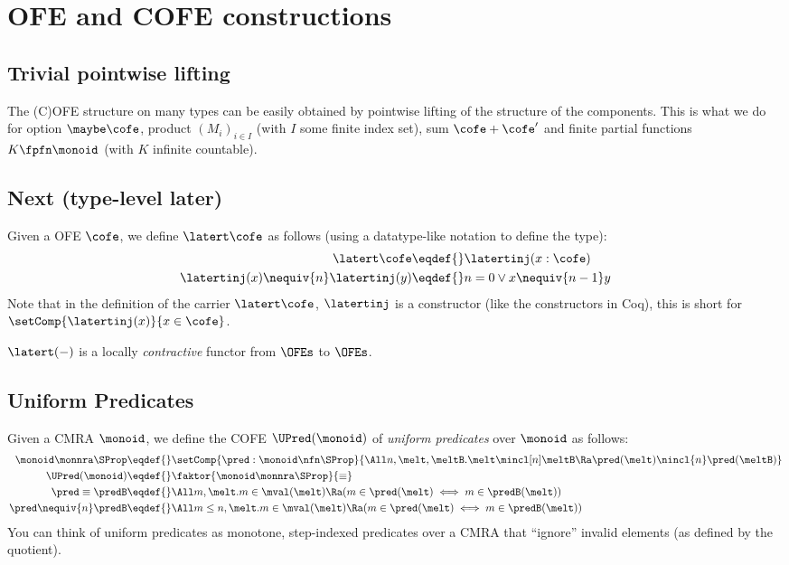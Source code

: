 \section{OFE and COFE constructions}

\subsection{Trivial pointwise lifting}

The (C)OFE structure on many types can be easily obtained by pointwise lifting of the structure of the components.
This is what we do for option $\maybe\cofe$, product $(M_i)_{i \in I}$ (with $I$ some finite index set), sum $\cofe + \cofe'$ and finite partial functions $K \fpfn \monoid$ (with $K$ infinite countable).

\subsection{Next (type-level later)}

Given a OFE $\cofe$, we define $\latert\cofe$ as follows (using a datatype-like notation to define the type):
\begin{align*}
  \latert\cofe \eqdef{}& \latertinj(x:\cofe) \\
  \latertinj(x) \nequiv{n} \latertinj(y) \eqdef{}& n = 0 \lor x \nequiv{n-1} y
\end{align*}
Note that in the definition of the carrier $\latert\cofe$, $\latertinj$ is a constructor (like the constructors in Coq), \ie this is short for $\setComp{\latertinj(x)}{x \in \cofe}$.

$\latert(-)$ is a locally \emph{contractive} functor from $\OFEs$ to $\OFEs$.


\subsection{Uniform Predicates}

Given a CMRA $\monoid$, we define the COFE $\UPred(\monoid)$ of \emph{uniform predicates} over $\monoid$ as follows:
\begin{align*}
\monoid \monnra \SProp \eqdef{}& \setComp{\pred: \monoid \nfn \SProp}
{\All n, \melt, \meltB. \melt \mincl[n] \meltB \Ra \pred(\melt) \nincl{n} \pred(\meltB)} \\
  \UPred(\monoid) \eqdef{}&  \faktor{\monoid \monnra \SProp}{\equiv} \\
  \pred \equiv \predB \eqdef{}& \All m, \melt. m \in \mval(\melt) \Ra (m \in \pred(\melt) \iff  m \in \predB(\melt)) \\
  \pred \nequiv{n} \predB \eqdef{}& \All m \le n, \melt. m \in \mval(\melt) \Ra (m \in \pred(\melt) \iff  m \in \predB(\melt))
\end{align*}
You can think of uniform predicates as monotone, step-indexed predicates over a CMRA that ``ignore'' invalid elements (as defined by the quotient).

